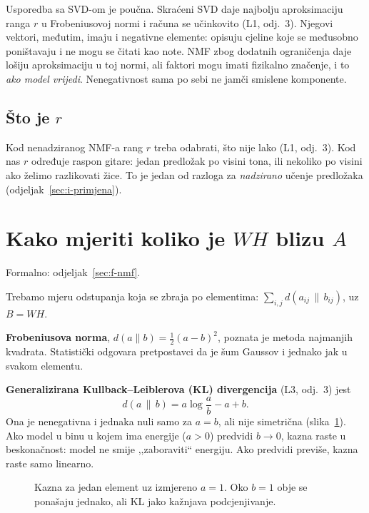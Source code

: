 \documentclass[11pt,a4paper]{article}
\theoremstyle{definition}
\theoremstyle{plain}
\theoremstyle{remark}
\newcommand{\formalno}[1]{{\small\color{muted}\sffamily Formalno: odjeljak~\ref{#1}.}\par}
\begin{document}
Usporedba sa SVD-om je poučna. Skraćeni SVD daje najbolju aproksimaciju ranga $r$ u Frobeniusovoj
normi i računa se učinkovito (L1, odj.~3). Njegovi vektori, međutim, imaju i negativne elemente:
opisuju cjeline koje se međusobno poništavaju i ne mogu se čitati kao note. NMF zbog dodatnih
ograničenja daje lošiju aproksimaciju u toj normi, ali faktori mogu imati fizikalno značenje, i to
\emph{ako model vrijedi}. Nenegativnost sama po sebi ne jamči smislene komponente.

\subsection{Što je \texorpdfstring{$r$}{r}}

Kod nenadziranog NMF-a rang $r$ treba odabrati, što nije lako (L1, odj.~3). Kod nas $r$ određuje
raspon gitare: jedan predložak po visini tona, ili nekoliko po visini ako želimo razlikovati žice.
To je jedan od razloga za \emph{nadzirano} učenje predložaka (odjeljak~\ref{sec:i-primjena}).

\section{Kako mjeriti koliko je \texorpdfstring{$WH$}{WH} blizu \texorpdfstring{$A$}{A}}\label{sec:i-cilj}
\formalno{sec:f-nmf}

Trebamo mjeru odstupanja koja se zbraja po elementima: $\sum_{i,j} d(a_{ij}\,\|\,b_{ij})$, uz
$B=WH$.

\textbf{Frobeniusova norma}, $d(a\|b)=\frac12(a-b)^2$, poznata je metoda najmanjih kvadrata.
Statistički odgovara pretpostavci da je šum Gaussov i jednako jak u svakom elementu.

\textbf{Generalizirana Kullback–Leiblerova (KL) divergencija} (L3, odj.~3) jest
\[
  d(a\,\|\,b) = a\log\frac{a}{b} - a + b .
\]
Ona je nenegativna i jednaka nuli samo za $a=b$, ali nije simetrična (slika~\ref{fig:kazne}).
Ako model u binu u kojem ima energije ($a>0$) predvidi $b\to0$, kazna raste u beskonačnost: model
ne smije ,,zaboraviti`` energiju. Ako predvidi previše, kazna raste samo linearno.

\begin{figure}[ht]
\centering
{}
\caption{Kazna za jedan element uz izmjereno $a=1$. Oko $b=1$ obje se ponašaju jednako, ali KL
jako kažnjava podcjenjivanje.}
\label{fig:kazne}
\end{figure}
\end{document}
